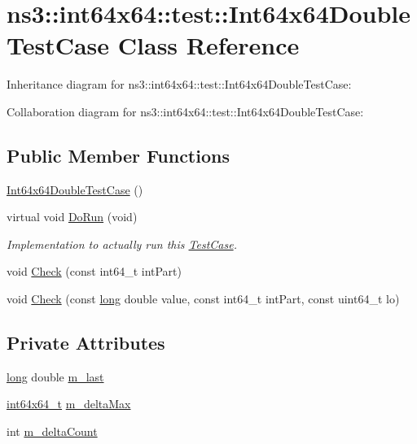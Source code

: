 \hypertarget{classns3_1_1int64x64_1_1test_1_1Int64x64DoubleTestCase}{}\section{ns3\+:\+:int64x64\+:\+:test\+:\+:Int64x64\+Double\+Test\+Case Class Reference}
\label{classns3_1_1int64x64_1_1test_1_1Int64x64DoubleTestCase}


Inheritance diagram for ns3\+:\+:int64x64\+:\+:test\+:\+:Int64x64\+Double\+Test\+Case\+:


Collaboration diagram for ns3\+:\+:int64x64\+:\+:test\+:\+:Int64x64\+Double\+Test\+Case\+:
\subsection*{Public Member Functions}
\begin{DoxyCompactItemize}
\item 
\hyperlink{classns3_1_1int64x64_1_1test_1_1Int64x64DoubleTestCase_a4262321347988573032612cff6e5f2c8}{Int64x64\+Double\+Test\+Case} ()
\item 
virtual void \hyperlink{classns3_1_1int64x64_1_1test_1_1Int64x64DoubleTestCase_a7f3d7d8fc5b7dc136a0029444f588414}{Do\+Run} (void)
\begin{DoxyCompactList}\small\item\em Implementation to actually run this \hyperlink{classns3_1_1TestCase}{Test\+Case}. \end{DoxyCompactList}\item 
void \hyperlink{classns3_1_1int64x64_1_1test_1_1Int64x64DoubleTestCase_a43340a930f4fbdf138cf3d084e6e2ff4}{Check} (const int64\+\_\+t int\+Part)
\item 
void \hyperlink{classns3_1_1int64x64_1_1test_1_1Int64x64DoubleTestCase_a5b790445b6ab0d238e3a2d28c7f0cd37}{Check} (const \hyperlink{generate__test__data__lte__sinr_8m_a0eab6be67e93c3411f7a8b53cc297285}{long} double value, const int64\+\_\+t int\+Part, const uint64\+\_\+t lo)
\end{DoxyCompactItemize}
\subsection*{Private Attributes}
\begin{DoxyCompactItemize}
\item 
\hyperlink{generate__test__data__lte__sinr_8m_a0eab6be67e93c3411f7a8b53cc297285}{long} double \hyperlink{classns3_1_1int64x64_1_1test_1_1Int64x64DoubleTestCase_a8ac90dc336e01dc3de2475f47ec10060}{m\+\_\+last}
\item 
\hyperlink{classint64x64__t}{int64x64\+\_\+t} \hyperlink{classns3_1_1int64x64_1_1test_1_1Int64x64DoubleTestCase_ab52535c9a92fd852a031900b3ba8b57d}{m\+\_\+delta\+Max}
\item 
int \hyperlink{classns3_1_1int64x64_1_1test_1_1Int64x64DoubleTestCase_a7d56d2679c037d6a28351eb3b8b20d3e}{m\+\_\+delta\+Count}
\end{DoxyCompactItemize}
